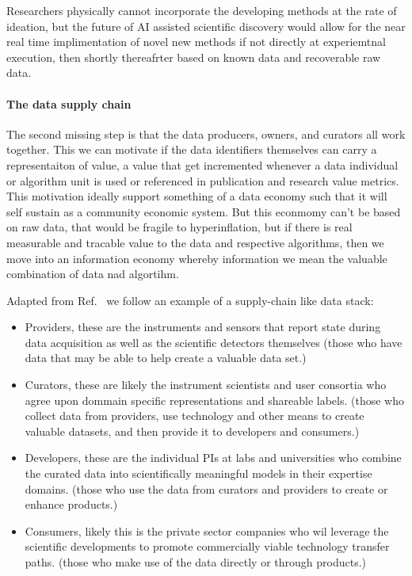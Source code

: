 \documentclass{article}
\begin{document}
Researchers physically cannot incorporate the developing methods at the rate of ideation, but the future of AI assisted scientific discovery would allow for the near real time implimentation of novel new methods if not directly at experiemtnal execution, then shortly thereafrter based on known data and recoverable raw data.

\paragraph{The data supply chain}
The second missing step is that the data producers, owners, and curators all work together.  This we can motivate if the data identifiers themselves can carry a representaiton of value, a value that get incremented whenever a data individual or algorithm unit is used or referenced in publication and research value metrics.
This motivation ideally support something of a data economy such that it will self sustain as a community economic system.  But this econmomy can't be based on raw data, that would be fragile to hyperinflation, but if there is real measurable and tracable value to the data and respective algorithms, then we move into an information economy whereby information we mean the valuable combination of data nad algortihm.

Adapted from Ref.~\cite{Elbaz2012} we follow an example of a supply-chain like data stack: %
\begin{itemize}
\item Providers, these are the instruments and sensors that report state during data acquisition as well as the scientific detectors themselves (those who have data that may be able to help create a valuable data set.)
\item Curators, these are likely the instrument scientists and user consortia who agree upon dommain specific representations and shareable labels. (those who collect data from providers, use technology and other means to create valuable datasets, and then provide it to developers and consumers.)
\item Developers, these are the individual PIs at labs and universities who combine the curated data into scientifically meaningful models in their expertise domains. (those who use the data from curators and providers to create or enhance products.)
\item Consumers, likely this is the private sector companies who wil leverage the scientific developments to promote commercially viable technology transfer paths. (those who make use of the data directly or through products.)
\end{itemize}
\end{document}
